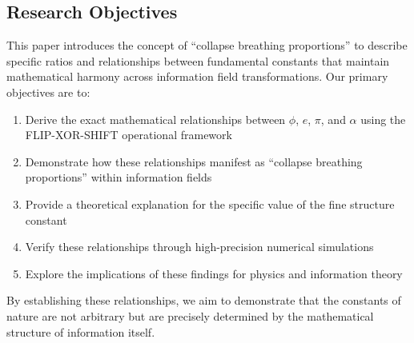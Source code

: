 \subsection{Research Objectives}

This paper introduces the concept of ``collapse breathing proportions'' to describe specific ratios and relationships between fundamental constants that maintain mathematical harmony across information field transformations. Our primary objectives are to:

\begin{enumerate}
    \item Derive the exact mathematical relationships between $\phi$, $e$, $\pi$, and $\alpha$ using the FLIP-XOR-SHIFT operational framework
    \item Demonstrate how these relationships manifest as ``collapse breathing proportions'' within information fields
    \item Provide a theoretical explanation for the specific value of the fine structure constant \cite{sommerfeld1916quantentheorie, gabrielse2006new}
    \item Verify these relationships through high-precision numerical simulations \cite{bailey2015high}
    \item Explore the implications of these findings for physics and information theory \cite{goyal2018information}
\end{enumerate}

By establishing these relationships, we aim to demonstrate that the constants of nature are not arbitrary but are precisely determined by the mathematical structure of information itself. 